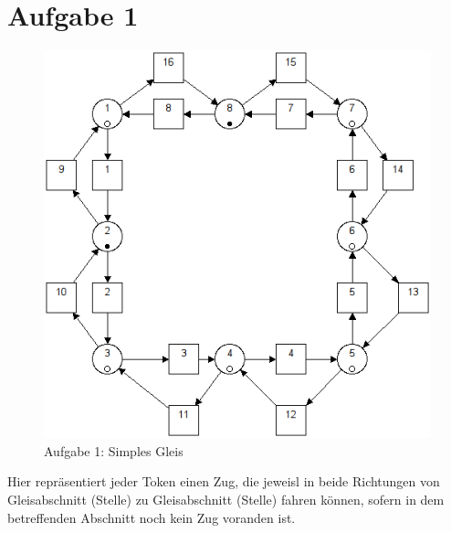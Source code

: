 \documentclass[10pt]{scrartcl}
\author{André Harms, Oliver Steenbuck}
\title{\titletext}
\date{04.04.2012}
\begin{document}
\maketitle

\setcounter{tocdepth}{3}
\tableofcontents

	\listoffigures  
	\lstlistoflistings	

\section{Aufgabe 1}
	\begin{figure}[H]
                \includegraphics[width=\textwidth]{aufgabe1.png}
        \caption{Aufgabe 1: Simples Gleis}
        \label{img:aufg1}
	\end{figure}
	Hier repräsentiert jeder Token einen Zug, die jeweisl in beide Richtungen von Gleisabschnitt (Stelle) zu Gleisabschnitt (Stelle) fahren können, sofern in dem betreffenden Abschnitt noch kein Zug voranden ist.
	
	
\end{document}

